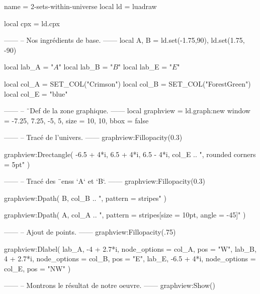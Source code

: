 \documentclass[border = 3pt]{standalone}
\begin{document}
\begin{luadraw*}{name = 2-sets-within-universe}
local ld = luadraw

local cpx = ld.cpx

------
-- Nos ingrédients de base.
------
local A, B = ld.set(-1.75,90), ld.set(1.75, -90)

local lab_A = "$A$"
local lab_B = "$B$"
local lab_E = "$E$"

local col_A = SET_COL("Crimson")
local col_B = SET_COL("ForestGreen")
local col_E = "blue"

------
-- ¨Def de la zone graphique.
------
local graphview = ld.graph:new{
  window = {-7.25, 7.25, -5, 5},
  size   = {10, 10},
  bbox   = false
}

------
-- Tracé de l'univers.
------
graphview:Fillopacity(0.3)

graphview:Drectangle(
  -6.5 + 4*i, 6.5 + 4*i, 6.5 - 4*i,
  col_E .. ", rounded corners = 5pt"
)

------
-- Tracé des ¨enss `A` et `B`.
------
graphview:Fillopacity(0.3)

graphview:Dpath(
  B,
  col_B .. ", pattern = stripes"
)

graphview:Dpath(
  A,
  col_A .. ", pattern = {stripes[size = 10pt, angle = -45]}"
)

------
-- Ajout de points.
------
graphview:Fillopacity(.75)

graphview:Dlabel(
  lab_A, -4 + 2.7*i, {node_options = col_A, pos = "W"},
  lab_B,  4 + 2.7*i, {node_options = col_B, pos = "E"},
  lab_E, -6.5 + 4*i, {node_options = col_E, pos = "NW"}
)

------
-- Montrons le résultat de notre oeuvre.
------
graphview:Show()
\end{luadraw*}
\end{document}

